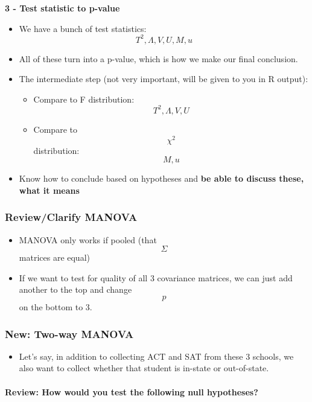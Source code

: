 \documentclass[]{article}
\providecommand{\tightlist}{%
  \setlength{\itemsep}{0pt}\setlength{\parskip}{0pt}}
\let\oldparagraph\paragraph
\renewcommand{\paragraph}[1]{\oldparagraph{#1}\mbox{}}
\begin{document}
\textbf{3 - Test statistic to p-value}

\begin{itemize}
\tightlist
\item
  We have a bunch of test statistics: \[T^2, \Lambda, V, U, M, u\]
\item
  All of these turn into a p-value, which is how we make our final
  conclusion.
\item
  The intermediate step (not very important, will be given to you in R
  output):

  \begin{itemize}
  \tightlist
  \item
    Compare to F distribution: \[T^2, \Lambda, V, U \]
  \item
    Compare to \[ \chi^2 \] distribution: \[M, u\]
  \end{itemize}
\item
  Know how to conclude based on hypotheses and \textbf{be able to
  discuss these, what it means}
\end{itemize}

\hypertarget{reviewclarify-manova}{%
\subsubsection{Review/Clarify MANOVA}\label{reviewclarify-manova}}

\begin{itemize}
\tightlist
\item
  MANOVA only works if pooled (that \[\Sigma\] matrices are equal)
\item
  If we want to test for quality of all 3 covariance matrices, we can
  just add another to the top and change \[p\] on the bottom to 3.
\end{itemize}

\hypertarget{new-two-way-manova}{%
\subsubsection{New: Two-way MANOVA}\label{new-two-way-manova}}

\begin{itemize}
\tightlist
\item
  Let's say, in addition to collecting ACT and SAT from these 3 schools,
  we also want to collect whether that student is in-state or
  out-of-state.
\end{itemize}

\hypertarget{review-how-would-you-test-the-following-null-hypotheses}{%
\paragraph{Review: How would you test the following null
hypotheses?}\label{review-how-would-you-test-the-following-null-hypotheses}}
\end{document}
